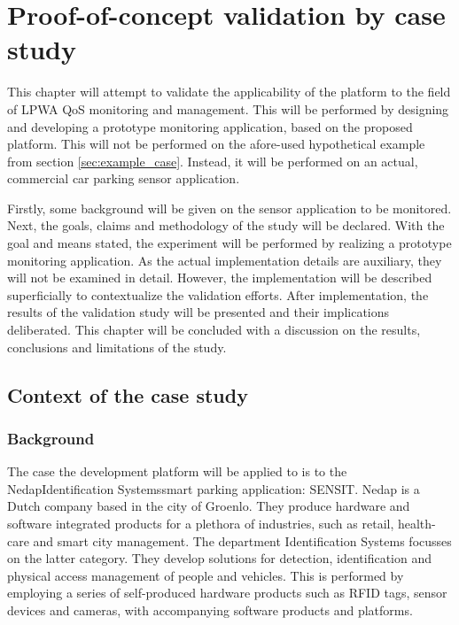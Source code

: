 \newcommand{\nedapidsystems}{\nedapidsystemsnospace\space}
\newcommand{\idsystems}{\idsystemsnospace\space}
\newcommand{\nedap}{\nedapnospace\space}
\newcommand{\ublox}{\ubloxnospace\space}
\newcommand{\sensit}{\sensitnospace\space}
\newcommand{\nedapidsystemsnospace}{\nedap\space\idsystems}
\newcommand{\idsystemsnospace}{Identification Systems}
\newcommand{\nedapnospace}{Nedap}
\newcommand{\ubloxnospace}{u-blox}
\newcommand{\sensitnospace}{SENSIT}
\chapter{Proof-of-concept validation by case study}
\label{ch:validation}
This chapter will attempt to validate the applicability of the platform to the field of LPWA QoS monitoring and management. This will be performed by designing and developing a prototype monitoring application, based on the proposed platform. This will not be performed on the afore-used hypothetical example from section \ref{sec:example_case}. Instead, it will be performed on an actual, commercial car parking sensor application.

Firstly, some background will be given on the sensor application to be monitored. Next, the goals, claims and methodology of the study will be declared. With the goal and means stated, the experiment will be performed by realizing a prototype monitoring application. As the actual implementation details are auxiliary, they will not be examined in detail. However, the implementation will be described superficially to contextualize the validation efforts. After implementation, the results of the validation study will be presented and their implications deliberated. This chapter will be concluded with a discussion on the results, conclusions and limitations of the study.
\section{Context of the case study}
\subsection{Background}
\label{sec:sensit}
The case the development platform will be applied to is to the \nedapidsystems smart parking application: \sensitnospace. \nedap\cite{web:nedap} is a Dutch company based in the city of Groenlo. They produce hardware and software integrated products for a plethora of industries, such as retail, health-care and smart city management. The department \idsystems\cite{web:idsystems} focusses on the latter category. They develop solutions for detection, identification and physical access management of people and vehicles. This is performed by employing a series of self-produced hardware products such as RFID tags, sensor devices and cameras, with accompanying software products and platforms.

